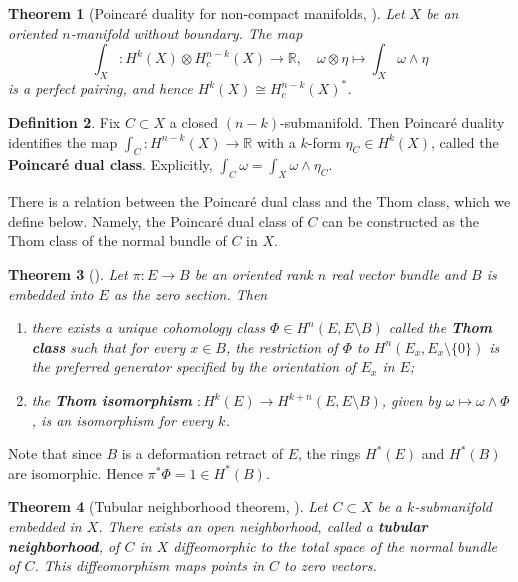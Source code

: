 \documentclass{report}
\theoremstyle{plain}
\newtheorem{theorem}{Theorem}[section]
\theoremstyle{definition}
\newtheorem{definition}[theorem]{Definition}
\theoremstyle{remark}
\newcommand{\bR}{\mathbb{R}}
\begin{document}
\begin{theorem}[Poincar\'e duality for non-compact manifolds, \cite{Bott1982}]
  Let $X$ be an oriented $n$-manifold without boundary. The map
  \[ \int_X\colon H^k(X) \otimes H^{n-k}_c(X) \to \bR, \quad \omega \otimes \eta \mapsto \int_X \omega \wedge \eta \]
  is a perfect pairing, and hence $H^k(X) \cong H^{n-k}_c(X)^*$.
\end{theorem}

\begin{definition}
  Fix $C \subset X$ a closed $(n-k)$-submanifold. Then Poincar\'e
  duality identifies the map $\int_C\colon H^{n-k}(X) \to \bR$
  with a $k$-form $\eta_C \in H^k(X)$, called the {\bf
    Poincar\'e dual class}. Explicitly, $\int_C \omega = \int_X \omega
  \wedge \eta_C$.
\end{definition}

There is a relation between the Poincar\'e dual class and the Thom
class, which we define below. Namely, the Poincar\'e dual class of $C$
can be constructed as the Thom class of the normal bundle of $C$ in
$X$.

\begin{theorem}[{\cite[Theorem 10.4]{Milnor1974}}] \label{thm:thom}
  Let $\pi\colon E \to B$ be an oriented rank $n$ real vector bundle
  and $B$ is embedded into $E$ as the zero section. Then
  \begin{enumerate}
  \item there exists a unique cohomology class $\Phi \in H^n(E, E
    \setminus B)$ called the {\bf Thom class} such that for every $x
    \in B$, the restriction of $\Phi$ to $H^n(E_x, E_x \setminus
    \{0\})$ is the preferred generator specified by the orientation of
    $E_x$ in $E$;
  \item the {\bf Thom isomorphism} $\colon H^k(E) \to H^{k+n}(E, E
    \setminus B)$, given by $\omega \mapsto \omega \wedge \Phi$, is an
    isomorphism for every $k$.
  \end{enumerate}
\end{theorem}

Note that since $B$ is a deformation retract of $E$, the rings
$H^*(E)$ and $H^*(B)$ are isomorphic. Hence $\pi^*\Phi = 1 \in
H^*(B)$.

\begin{theorem}[Tubular neighborhood theorem, {\cite[Theorem 11.1]{Milnor1974}}]
  Let $C \subset X$ be a $k$-submanifold embedded in $X$. There exists
  an open neighborhood, called a {\bf tubular neighborhood}, of $C$ in
  $X$ diffeomorphic to the total space of the normal bundle of $C$.
  This diffeomorphism maps points in $C$ to zero vectors.
\end{theorem}
\end{document}
